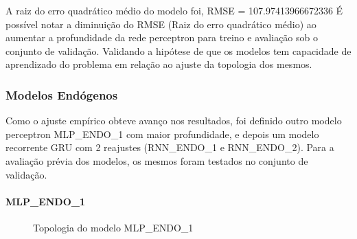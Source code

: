 \documentclass[	12pt, Times, openright, twoside, a4paper, english, brazil]{abntex2}
\begin{document}
                 A raiz do erro quadrático médio do modelo foi, RMSE = 107.97413966672336
    	        É possível notar a diminuição do RMSE (Raiz do erro quadrático médio) ao aumentar a profundidade da rede perceptron para treino e avaliação sob o conjunto de validação. Validando a hipótese de que os modelos tem capacidade de aprendizado do problema em relação ao ajuste da topologia dos mesmos.
          \subsubsection{Modelos Endógenos}
    	        Como o ajuste empírico obteve avanço nos resultados, foi definido outro modelo perceptron MLP\_ENDO\_1 com maior profundidade, e depois um modelo recorrente GRU com 2 reajustes (RNN\_ENDO\_1 e RNN\_ENDO\_2).
              Para a avaliação prévia dos modelos, os mesmos foram testados no conjunto de validação.
              \paragraph{MLP\_ENDO\_1}
      	        \begin{figure}[!ht]
                	\caption{Topologia do modelo MLP\_ENDO\_1 \label{fig:case1_mlp_endo1} }
                \end{figure}
\end{document}
